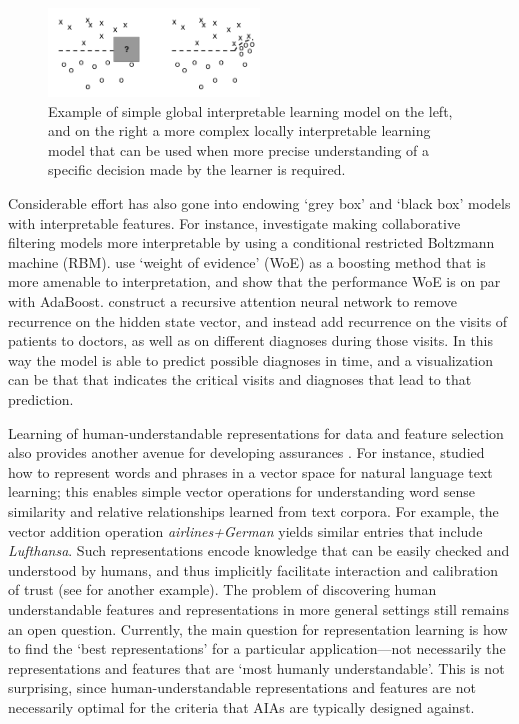 \begin{figure}[htbp]
    \centering
    \includegraphics[width=0.5\textwidth]{Figures/global_local}
    \caption{Example of simple global interpretable learning model on the left, and on the right a more complex locally interpretable learning model that can be used when more precise understanding of a specific decision made by the learner is required. }
    \label{fig:ruping}
\end{figure}

Considerable effort has also gone into endowing `grey box' and `black box' models with interpretable features. 
For instance, \citet{Abdollahi2016-vn} investigate making collaborative filtering models more interpretable by using a conditional restricted Boltzmann machine (RBM). \citet{Ridgeway1998-lv} use `weight of evidence' (WoE) as a boosting method that is more amenable to interpretation, and show that the performance WoE is on par with AdaBoost. \citet{Choi2016-by} construct a recursive attention neural network to remove recurrence on the hidden state vector, and instead add recurrence on the visits of patients to doctors, as well as on different diagnoses during those visits. In this way the model is able to predict possible diagnoses in time, and a visualization can be that that indicates the critical visits and diagnoses that lead to that prediction.

Learning of human-understandable representations for data and feature selection also provides another avenue for developing assurances  \cite{Bengio2013-uv, Guyon2003-fj}. For instance, \citet{Mikolov2013-lt} studied how to represent words and phrases in a vector space for natural language text learning; this enables simple vector operations for understanding word sense similarity and relative relationships learned from text corpora. For example, the vector addition operation \emph{airlines+German} yields similar entries that include \emph{Lufthansa}. Such representations encode knowledge that can be easily checked and understood by humans, and thus implicitly facilitate interaction and calibration of trust (see \cite{Haury2011-zi} for another example). The problem of discovering human understandable features and representations in more general settings still remains an open question. Currently, the main question for representation learning is how to find the `best representations' for a particular application---not necessarily the representations and features that are `most humanly understandable'. This is not surprising, since human-understandable representations and features are not necessarily optimal for the criteria that AIAs are typically designed against. 

